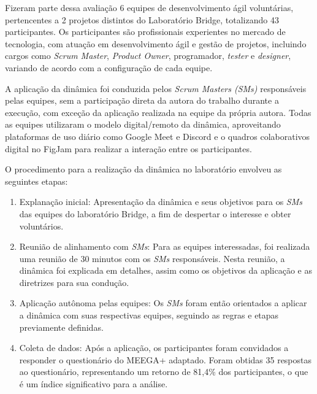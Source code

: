 \documentclass[
	12pt,
	openright,
	twoside,
	a4paper,
	english,
	brazil
	]{abntex2}
\begin{document}
Fizeram parte dessa avaliação 6 equipes de desenvolvimento ágil voluntárias, pertencentes a 2 projetos distintos do Laboratório Bridge, totalizando 43 participantes. Os participantes são profissionais experientes no mercado de tecnologia, com atuação em desenvolvimento ágil e gestão de projetos, incluindo cargos como \textit{Scrum Master}, \textit{Product Owner}, programador, \textit{tester} e \textit{designer}, variando de acordo com a configuração de cada equipe.

A aplicação da dinâmica foi conduzida pelos \textit{Scrum Masters (SMs)} responsáveis pelas equipes, sem a participação direta da autora do trabalho durante a execução, com exceção da aplicação realizada na equipe da própria autora. Todas as equipes utilizaram o modelo digital/remoto da dinâmica, aproveitando plataformas de uso diário como Google Meet e Discord e o quadros colaborativos digital no FigJam para realizar a interação entre os participantes.

O procedimento para a realização da dinâmica no laboratório envolveu as seguintes etapas:
\begin{enumerate}
  \item Explanação inicial: Apresentação da dinâmica e seus objetivos para os \textit{SMs} das equipes do laboratório Bridge, a fim de despertar o interesse e obter voluntários.
  \item Reunião de alinhamento com \textit{SMs}: Para as equipes interessadas, foi realizada uma reunião de 30 minutos com os \textit{SMs} responsáveis. Nesta reunião, a dinâmica foi explicada em detalhes, assim como os objetivos da aplicação e as diretrizes para sua condução.
  \item Aplicação autônoma pelas equipes: Os \textit{SMs} foram então orientados a aplicar a dinâmica com suas respectivas equipes, seguindo as regras e etapas previamente definidas.
  \item Coleta de dados: Após a aplicação, os participantes foram convidados a responder o questionário do MEEGA+ adaptado. Foram obtidas 35 respostas ao questionário, representando um retorno de 81,4\% dos participantes, o que é um índice significativo para a análise.
\end{enumerate}
\end{document}
